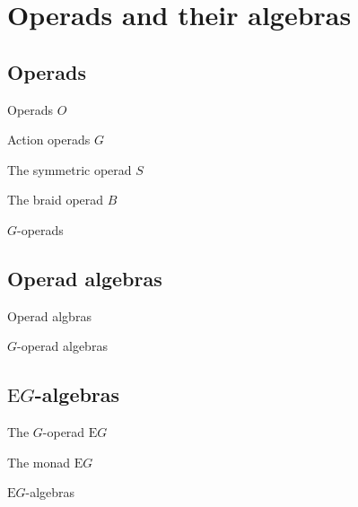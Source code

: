 \section{Operads and their algebras}

\subsection{Operads}

\begin{defn} Operads $O$ \end{defn}

\begin{defn} Action operads $G$ \end{defn}

\begin{example} The symmetric operad $S$ \end{example}

\begin{example} The braid operad $B$ \end{example}

\begin{defn} $G$-operads \end{defn}

\subsection{Operad algebras}

\begin{defn} Operad algbras \end{defn}

\begin{defn} $G$-operad algebras \end{defn}

\subsection{$\mathrm{E}G$-algebras}

\begin{defn} The $G$-operad $\mathrm{E}G$ \end{defn}

\begin{defn}\label{monaddef} The monad $\mathrm{E}G$ \end{defn}

\begin{defn} $\mathrm{E}G$-algebras \end{defn}

